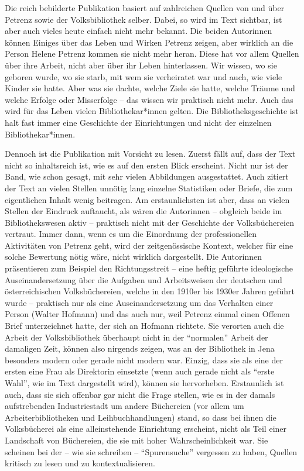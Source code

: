 \documentclass[a4paper,
fontsize=11pt,
oneside,
numbers=noperiodatend,
parskip=half-,
bibliography=totoc,
final
]{scrartcl}
\begin{document}
Die reich bebilderte Publikation basiert auf zahlreichen Quellen von und
über Petrenz sowie der Volksbibliothek selber. Dabei, so wird im Text
sichtbar, ist aber auch vieles heute einfach nicht mehr bekannt. Die
beiden Autorinnen können Einiges über das Leben und Wirken Petrenz
zeigen, aber wirklich an die Person Helene Petrenz kommen sie nicht mehr
heran. Diese hat vor allem Quellen über ihre Arbeit, nicht aber über ihr
Leben hinterlassen. Wir wissen, wo sie geboren wurde, wo sie starb, mit
wem sie verheiratet war und auch, wie viele Kinder sie hatte. Aber was
sie dachte, welche Ziele sie hatte, welche Träume und welche Erfolge
oder Misserfolge -- das wissen wir praktisch nicht mehr. Auch das wird
für das Leben vielen Bibliothekar*innen gelten. Die
Bibliotheksgeschichte ist halt fast immer eine Geschichte der
Einrichtungen und nicht der einzelnen Bibliothekar*innen.

Dennoch ist die Publikation mit Vorsicht zu lesen. Zuerst fällt auf,
dass der Text nicht so inhaltsreich ist, wie es auf den ersten Blick
erscheint. Nicht nur ist der Band, wie schon gesagt, mit sehr vielen
Abbildungen ausgestattet. Auch zitiert der Text an vielen Stellen
unnötig lang einzelne Statistiken oder Briefe, die zum eigentlichen
Inhalt wenig beitragen. Am erstaunlichsten ist aber, dass an vielen
Stellen der Eindruck auftaucht, als wären die Autorinnen -- obgleich
beide im Bibliothekswesen aktiv -- praktisch nicht mit der Geschichte
der Volksbüchereien vertraut. Immer dann, wenn es um die Einordnung der
professionellen Aktivitäten von Petrenz geht, wird der zeitgenössische
Kontext, welcher für eine solche Bewertung nötig wäre, nicht wirklich
dargestellt. Die Autorinnen präsentieren zum Beispiel den
Richtungsstreit -- eine heftig geführte ideologische Auseinandersetzung
über die Aufgaben und Arbeitsweisen der deutschen und österreichischen
Volksbüchereien, welche in den 1910er bis 1930er Jahren geführt wurde --
praktisch nur als eine Auseinandersetzung um das Verhalten einer Person
(Walter Hofmann) und das auch nur, weil Petrenz einmal einen Offenen
Brief unterzeichnet hatte, der sich an Hofmann richtete. Sie verorten
auch die Arbeit der Volksbibliothek überhaupt nicht in der
\enquote{normalen} Arbeit der damaligen Zeit, können also nirgends
zeigen, was an der Bibliothek in Jena besonders modern oder gerade nicht
modern war. Einzig, dass sie als eine der ersten eine Frau als
Direktorin einsetzte (wenn auch gerade nicht als \enquote{erste Wahl},
wie im Text dargestellt wird), können sie hervorheben. Erstaunlich ist
auch, dass sie sich offenbar gar nicht die Frage stellen, wie es in der
damals aufstrebenden Industriestadt um andere Büchereien (vor allem um
Arbeiterbibliotheken und Leihbuchhandlungen) stand, so dass bei ihnen
die Volksbücherei als eine alleinstehende Einrichtung erscheint, nicht
als Teil einer Landschaft von Büchereien, die sie mit hoher
Wahrscheinlichkeit war. Sie scheinen bei der -- wie sie schreiben --
\enquote{Spurensuche} vergessen zu haben, Quellen kritisch zu lesen und
zu kontextualisieren.
\end{document}

